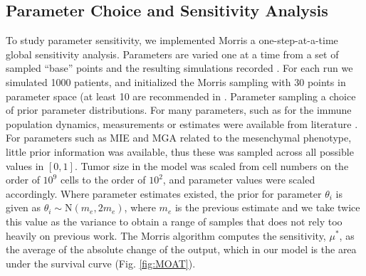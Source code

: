 \documentclass[11pt]{article}
\begin{document}
\subsection{Parameter Choice and Sensitivity Analysis}
To study parameter sensitivity, we implemented Morris a one-step-at-a-time global sensitivity analysis. Parameters are varied one at a time from a set of sampled ``base'' points and the resulting simulations recorded \cite{morris1991factorial, sohier2014improvement}. For each run we simulated 1000 patients, and initialized the Morris sampling with 30 points in parameter space (at least 10 are recommended in \cite{sohier2014improvement}. Parameter sampling a choice of prior parameter distributions. For many parameters, such as for the immune population dynamics,  measurements or estimates were available from literature \cite{de2014modeling}. For parameters such as MIE and MGA related to the mesenchymal phenotype, little prior information was available, thus these was sampled across all possible values in $[0,1]$. Tumor size in the model was scaled from cell numbers on the order of $10^9$ cells\cite{de2014modeling} to the order of $10^2$, and parameter values were scaled accordingly. Where parameter estimates existed, the prior for parameter $\theta_i$ is given as $\theta_i \sim \textrm{N}(m_e, 2m_e)$, where $m_e$ is the previous estimate and we take twice this value as the variance to obtain a range of samples that does not rely too heavily on previous work. The Morris algorithm computes the sensitivity, $\mu^*$, as the average of the absolute change of the output, which in our model is the area under the survival curve (Fig. \ref{fig:MOAT}).
\end{document}
